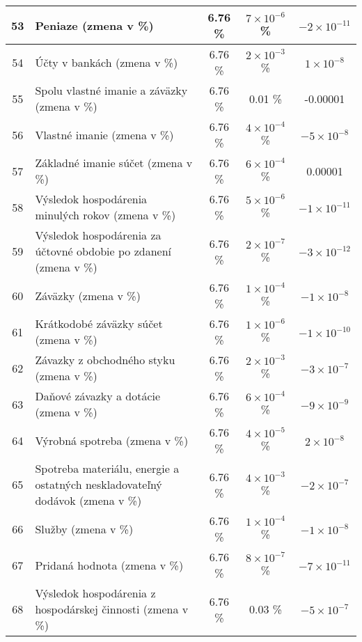 \begin{longtable}{ |c|p{5cm}|c|c|c| }
        \hline
        53 & Peniaze (zmena v \%) & 6.76 \% & \(7 \times 10^{-6}\) \% & \(-2 \times 10^{-11}\) \\
        \hline
        54 & Účty v bankách (zmena v \%) & 6.76 \% & \(2 \times 10^{-3}\) \% & \(1 \times 10^{-8}\) \\
        \hline
        55 & Spolu vlastné imanie a záväzky (zmena v \%) & 6.76 \% & 0.01 \% & -0.00001 \\
        \hline
        56 & Vlastné imanie (zmena v \%) & 6.76 \% & \(4 \times 10^{-4}\) \% & \(-5 \times 10^{-8}\) \\
        \hline
        57 & Základné imanie súčet (zmena v \%) & 6.76 \% & \(6 \times 10^{-4}\) \% & 0.00001 \\
        \hline
        58 & Výsledok hospodárenia minulých rokov (zmena v \%) & 6.76 \% & \(5 \times 10^{-6}\) \% & \(-1 \times 10^{-11}\) \\
        \hline
        59 & Výsledok hospodárenia za účtovné obdobie po zdanení (zmena v \%) & 6.76 \% & \(2 \times 10^{-7}\) \% & \(-3 \times 10^{-12}\) \\
        \hline
        60 & Záväzky (zmena v \%) & 6.76 \% & \(1 \times 10^{-4}\) \% & \(-1 \times 10^{-8}\) \\
        \hline
        61 & Krátkodobé záväzky súčet (zmena v \%) & 6.76 \% & \(1 \times 10^{-6}\) \% & \(-1 \times 10^{-10}\) \\
        \hline
        62 & Závazky z obchodného styku (zmena v \%) & 6.76 \% & \(2 \times 10^{-3}\) \% & \(-3 \times 10^{-7}\) \\
        \hline
        63 & Daňové závazky a dotácie (zmena v \%) & 6.76 \% & \(6 \times 10^{-4}\) \% & \(-9 \times 10^{-9}\) \\
        \hline
        64 & Výrobná spotreba (zmena v \%) & 6.76 \% & \(4 \times 10^{-5}\) \% & \(2 \times 10^{-8}\) \\
        \hline
        65 & Spotreba materiálu, energie a ostatných neskladovateľný dodávok (zmena v \%) & 6.76 \% & \(4 \times 10^{-3}\) \% & \(-2 \times 10^{-7}\) \\
        \hline
        66 & Služby (zmena v \%) & 6.76 \% & \(1 \times 10^{-4}\) \% & \(-1 \times 10^{-8}\) \\
        \hline
        67 & Pridaná hodnota (zmena v \%) & 6.76 \% & \(8 \times 10^{-7}\) \% & \(-7 \times 10^{-11}\) \\
        \hline
        68 & Výsledok hospodárenia z hospodárskej činnosti (zmena v \%) & 6.76 \% & 0.03 \% & \(-5 \times 10^{-7}\) \\

\end{longtable}
